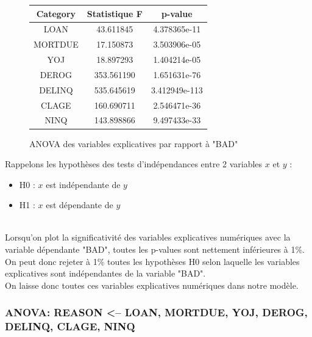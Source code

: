 \documentclass[a4paper,12pt]{report}
\begin{document}
\begin{figure}[h!]
  \begin{center}
    \begin{tabular}{||c c c||} 
     \hline
     Category & Statistique F & p-value \\ [0.5ex] 
     \hline\hline
     LOAN & 43.611845 & 4.378365e-11 \\ 
     \hline
     MORTDUE & 17.150873 & 3.503906e-05 \\
     \hline
     YOJ & 18.897293 & 1.404214e-05 \\
     \hline
     DEROG & 353.561190 & 1.651631e-76 \\
     \hline
     DELINQ & 535.645619 & 3.412949e-113 \\
     \hline
     CLAGE & 160.690711 & 2.546471e-36 \\
     \hline
     NINQ & 143.898866 & 9.497433e-33 \\ [1ex] 
     \hline
    \end{tabular}
  \end{center}
  \caption{ANOVA des variables explicatives par rapport à "BAD"}
  \label{fig:anova_bad_cat_on_nums}
\end{figure}

Rappelons les hypothèses des tests d'indépendances entre 2 variables $x$ et $y$ :

\begin{itemize}
  \item H0 : $x$ est indépendante de $y$  
  \item H1 : $x$ est dépendante de $y$
\end{itemize}
\ \\
Lorsqu'on plot la significativité des variables explicatives numériques avec la variable dépendante "BAD", toutes les p-values sont nettement inférieures à 1\%.  
On peut donc rejeter à 1\% toutes les hypothèses H0 selon laquelle les variables explicatives sont indépendantes de la variable "BAD".\\
On laisse donc toutes ces variables explicatives numériques dans notre modèle.


\subsubsection{ANOVA: REASON <-- LOAN, MORTDUE, YOJ, DEROG, DELINQ, CLAGE, NINQ }
\end{document}
